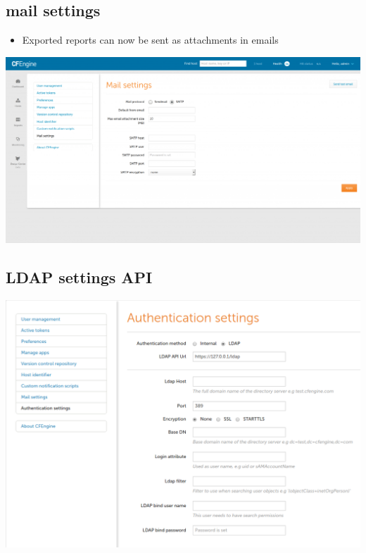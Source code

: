 \documentclass[11pt]{article}
\begin{document}
\subsection*{mail settings}
\label{sec:org46ffa86}
\begin{itemize}
\item Exported reports can now be sent as attachments in emails
\end{itemize}

\begin{center}
\includegraphics[width=.9\linewidth]{data/74/8d9e15-278e-46ac-822f-9e0f7e6b2830/mail-settings-1024x537_2018-01-14_12-01-05.png}
\end{center}

\subsection*{LDAP settings API}
\label{sec:org1e61904}
\begin{center}
\includegraphics[width=.9\linewidth]{data/29/4c1258-49f4-4c72-9f8d-2b7535cfbea8/Authentication-settings_2018-01-14_12-04-18.png}
\end{center}
\end{document}
